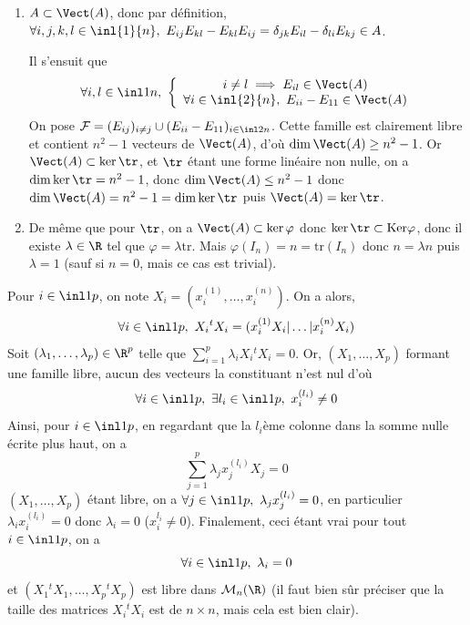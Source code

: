 \begin{solution}
    \begin{enumerate}
        \item $A\subset \Vect(A)$, donc par définition, 
        $\forall i,j,k,l\in\inl{1}{n},\ E_{ij}E_{kl}-E_{kl}E_{ij}=\delta_{jk}E_{il}-\delta_{li}E_{kj}\in A$. 
    
        Il s'ensuit que
        \[
            \forall i,l\in\inl1n,\ 
            \left\lbrace\begin{array}c i\neq l\implies E_{il}\in \Vect(A)\\
                 \forall i\in\inl{2}{n},\ E_{ii}-E_{11}\in \Vect(A)\end{array}\right. 
        \]
        On pose $\mathcal F=(E_{ij})_{i\neq j}\cup(E_{ii}-E_{11})_{i\in\inl2n}$.
        Cette famille est clairement libre et contient $n^2-1$ vecteurs de $\Vect(A)$,
        d'où $\dim\Vect(A)\geq n^2-1$. 
        Or $\Vect(A)\subset \ker\tr$, et $\tr$ étant une forme linéaire non nulle,
        on a $\dim\ker\tr=n^2-1$, donc $\dim\Vect(A)\leq n^2-1$ 
        donc $\dim\Vect(A)=n^2-1=\dim\ker\tr$ puis $\Vect(A)=\ker\tr$.
        \item De même que pour $\tr$, on a $\Vect(A)\subset \ker\varphi$
        donc $\ker\tr\subset \text{Ker}\varphi$, donc il existe $\lambda\in\R$
        tel que $\varphi=\lambda\text{tr}$. Mais $\varphi(I_n)=n=\text{tr}(I_n)$
        donc $n=\lambda n$ puis $\lambda = 1$ (sauf si $n=0$, mais ce cas est trivial).
    \end{enumerate}
\end{solution}

\begin{solution}
    Pour $i\in\inl1p$, on note $X_i=(x_i^{(1)},\dots,x_i^{(n)})$. On a alors, \[\forall i\in\inl1p,\ X_i{}^tX_i=(x_i^{(1)}X_i|\dots|x_i^{(n)}X_i)\]
    Soit $(\lambda_1,\dots,\lambda_p)\in\R^p$ telle que $\sum_{i=1}^p\lambda_iX_i{}^tX_i=0$.
    Or, $(X_1,\dots,X_p)$ formant une famille libre, aucun des vecteurs la constituant n'est nul d'où
    \[\forall i\in\inl1p,\ \exists l_i\in\inl1p,\ x_i^{(l_i)}\neq 0\]
    Ainsi, pour $i\in\inl1p$, en regardant que la $l_i$ème colonne dans la somme nulle écrite plus haut, 
    on a \[\sum_{j=1}^p\lambda_jx_j^{(l_i)}X_j=0\]
    $(X_1,\dots,X_p)$ étant libre, on a $\forall j\in\inl1p,\ \lambda_jx_j^{(l_i)}=0$, en particulier $\lambda_ix_i^{(l_i)}=0$
    donc $\lambda_i=0$ ($x_i^{l_i}\neq 0$). 
    Finalement, ceci étant vrai pour tout $i\in\inl1p$, on a 
    \[\forall i\in\inl1p,\ \lambda_i=0\] et $(X_1{}^tX_1,\dots,X_p{}^tX_p)$ est libre dans $\mathcal M_n(\R)$
    (il faut bien sûr préciser que la taille des matrices $X_i{}^tX_i$ est de $n\times n$, mais cela est bien clair).
\end{solution}

